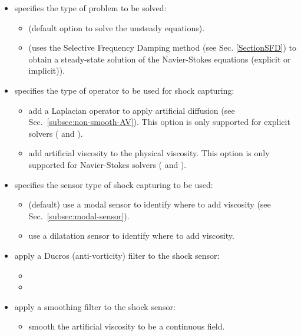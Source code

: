 \begin{itemize}
\begin{itemize}
          ).
      \end{itemize}
  \item {} specifies the type of problem to be solved:
    \begin{itemize}
      \item {} (default option to solve the unsteady equations).
      \item {} (uses the Selective Frequency Damping method
        (see Sec. \ref{SectionSFD}) to obtain a steady-state solution of the
        Navier-Stokes equations (explicit or implicit)).
    \end{itemize}
  \item {} specifies the type of operator to be used for shock capturing:
    \begin{itemize}
      \item {} add a Laplacian operator to apply artificial diffusion (see Sec.~\ref{subsec:non-smooth-AV}). 
        This option is only supported for explicit solvers ( and ).
      \item {} add artificial viscosity to the physical viscosity.
        This option is only supported for Navier-Stokes solvers ( and ).
    \end{itemize}
  \item {} specifies the sensor type of shock capturing to be used:
    \begin{itemize}
      \item {} (default) use a modal sensor to identify where to add viscosity (see Sec.~\ref{subsec:modal-sensor}).
      \item {} use a dilatation sensor to identify where to add viscosity.
    \end{itemize}
  \item {} apply a Ducros \cite{ducros1999large} (anti-vorticity) filter to the shock sensor:
    \begin{itemize}
      \item {}
      \item {}
    \end{itemize}
  \item {} apply a smoothing filter to the shock sensor:
    \begin{itemize}
      \item {} smooth the artificial viscosity to be a continuous field.

\end{itemize}
\end{itemize}
